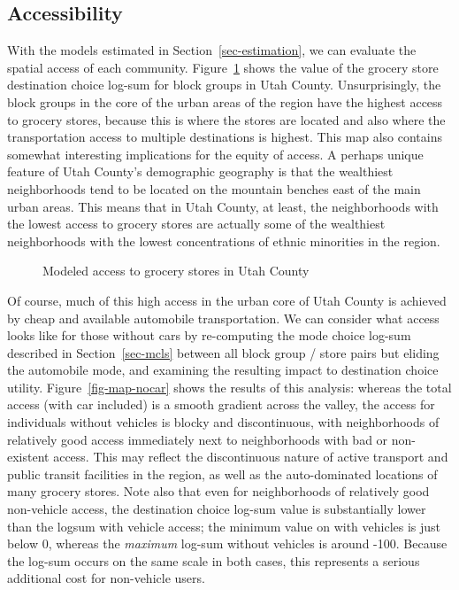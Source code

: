 \documentclass[
  letterpaper,
  number,
  review,
  3p]{elsarticle}
\begin{document}
\subsection{Accessibility}\label{sec-access}

With the models estimated in Section~\ref{sec-estimation}, we can
evaluate the spatial access of each community. Figure~\ref{fig-map-ut}
shows the value of the grocery store destination choice log-sum for
block groups in Utah County. Unsurprisingly, the block groups in the
core of the urban areas of the region have the highest access to grocery
stores, because this is where the stores are located and also where the
transportation access to multiple destinations is highest. This map also
contains somewhat interesting implications for the equity of access. A
perhaps unique feature of Utah County's demographic geography is that
the wealthiest neighborhoods tend to be located on the mountain benches
east of the main urban areas. This means that in Utah County, at least,
the neighborhoods with the lowest access to grocery stores are actually
some of the wealthiest neighborhoods with the lowest concentrations of
ethnic minorities in the region.

\begin{figure}


\caption{\label{fig-map-ut}Modeled access to grocery stores in Utah
County}

\end{figure}%

Of course, much of this high access in the urban core of Utah County is
achieved by cheap and available automobile transportation. We can
consider what access looks like for those without cars by re-computing
the mode choice log-sum described in Section~\ref{sec-mcls} between all
block group / store pairs but eliding the automobile mode, and examining
the resulting impact to destination choice utility.
Figure~\ref{fig-map-nocar} shows the results of this analysis: whereas
the total access (with car included) is a smooth gradient across the
valley, the access for individuals without vehicles is blocky and
discontinuous, with neighborhoods of relatively good access immediately
next to neighborhoods with bad or non-existent access. This may reflect
the discontinuous nature of active transport and public transit
facilities in the region, as well as the auto-dominated locations of
many grocery stores. Note also that even for neighborhoods of relatively
good non-vehicle access, the destination choice log-sum value is
substantially lower than the logsum with vehicle access; the minimum
value on with vehicles is just below 0, whereas the \emph{maximum}
log-sum without vehicles is around -100. Because the log-sum occurs on
the same scale in both cases, this represents a serious additional cost
for non-vehicle users.
\end{document}
